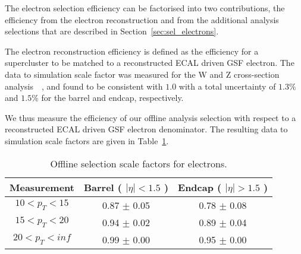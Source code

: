 
The electron selection efficiency can be factorised into two contributions,
the efficiency from the electron reconstruction and from the additional
analysis selections that are described in Section~\ref{sec:sel_electrons}.

The electron reconstruction efficiency is defined as the efficiency for a
supercluster to be matched to a reconstructed ECAL driven GSF electron.
The data to simulation scale factor was measured for the W and Z cross-section
analysis~\cite{VBTFCrossSectionNote}~\cite{ref:tagprobe_mit_w},
and found to be consistent with $1.0$ with a total uncertainty of
$1.3\%$ and $1.5\%$ for the barrel and endcap, respectively.

We thus measure the efficiency of our offline analysis selection 
with respect to a reconstructed ECAL driven GSF electron denominator. 
The resulting data to simulation scale factors are given in Table~\ref{tab:eff_ele_offline}.

\begin{table}[!ht]
\begin{center}
\begin{tabular}{c|c|c}
\hline
Measurement & Barrel ( $|\eta|<1.5$ )   & Endcap ( $|\eta|>1.5$ )  \\ 
\hline
$  10<p_T<  15$ & 0.87 $\pm$ 0.05  & 0.78 $\pm$ 0.08  \\ \hline 
$  15<p_T<  20$ & 0.94 $\pm$ 0.02  & 0.89 $\pm$ 0.04  \\ \hline 
$  20<p_T<  inf$ & 0.99 $\pm$ 0.00  & 0.95 $\pm$ 0.00  \\ \hline 
\end{tabular}
\caption{Offline selection scale factors for electrons.}
\label{tab:eff_ele_offline}
\end{center}
\end{table}

